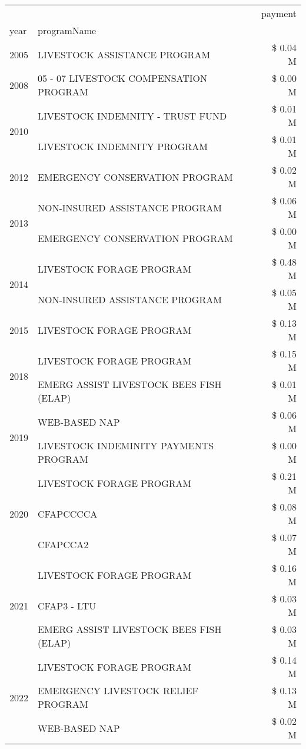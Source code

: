 \begin{tabular}{llr}
\toprule
 &  & payment \\
year & programName &  \\
\midrule
2005 & LIVESTOCK ASSISTANCE PROGRAM & \$ 0.04 M \\
\cline{1-3}
2008 & 05 - 07 LIVESTOCK COMPENSATION PROGRAM & \$ 0.00 M \\
\cline{1-3}
\multirow[t]{2}{*}{2010} & LIVESTOCK INDEMNITY - TRUST FUND & \$ 0.01 M \\
 & LIVESTOCK INDEMNITY PROGRAM & \$ 0.01 M \\
\cline{1-3}
2012 & EMERGENCY CONSERVATION PROGRAM & \$ 0.02 M \\
\cline{1-3}
\multirow[t]{2}{*}{2013} & NON-INSURED ASSISTANCE PROGRAM & \$ 0.06 M \\
 & EMERGENCY CONSERVATION PROGRAM & \$ 0.00 M \\
\cline{1-3}
\multirow[t]{2}{*}{2014} & LIVESTOCK FORAGE PROGRAM & \$ 0.48 M \\
 & NON-INSURED ASSISTANCE PROGRAM & \$ 0.05 M \\
\cline{1-3}
2015 & LIVESTOCK FORAGE PROGRAM & \$ 0.13 M \\
\cline{1-3}
\multirow[t]{2}{*}{2018} & LIVESTOCK FORAGE PROGRAM & \$ 0.15 M \\
 & EMERG ASSIST LIVESTOCK BEES FISH (ELAP) & \$ 0.01 M \\
\cline{1-3}
\multirow[t]{2}{*}{2019} & WEB-BASED NAP & \$ 0.06 M \\
 & LIVESTOCK INDEMINITY PAYMENTS PROGRAM & \$ 0.00 M \\
\cline{1-3}
\multirow[t]{3}{*}{2020} & LIVESTOCK FORAGE PROGRAM & \$ 0.21 M \\
 & CFAPCCCCA & \$ 0.08 M \\
 & CFAPCCA2 & \$ 0.07 M \\
\cline{1-3}
\multirow[t]{3}{*}{2021} & LIVESTOCK FORAGE PROGRAM & \$ 0.16 M \\
 & CFAP3 - LTU & \$ 0.03 M \\
 & EMERG ASSIST LIVESTOCK BEES FISH (ELAP) & \$ 0.03 M \\
\cline{1-3}
\multirow[t]{3}{*}{2022} & LIVESTOCK FORAGE PROGRAM & \$ 0.14 M \\
 & EMERGENCY LIVESTOCK RELIEF PROGRAM & \$ 0.13 M \\
 & WEB-BASED NAP & \$ 0.02 M \\
\cline{1-3}
\bottomrule
\end{tabular}
